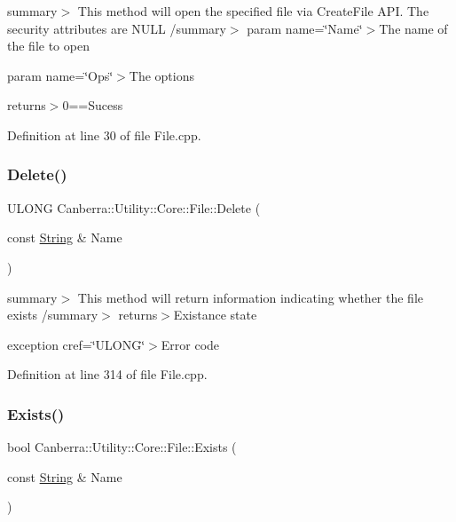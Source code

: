 summary$>$ This method will open the specified file via Create\+File A\+PI. The security attributes are N\+U\+LL /summary$>$ param name=\char`\"{}\+Name\char`\"{}$>$The name of the file to open

param name=\char`\"{}\+Ops\char`\"{}$>$The options

returns$>$0==Sucess

Definition at line 30 of file File.\+cpp.

\mbox{\label{class_canberra_1_1_utility_1_1_core_1_1_file_a21294a585475929cf9c68a165816b7a7_a21294a585475929cf9c68a165816b7a7}} 
\subsubsection{\texorpdfstring{Delete()}{Delete()}}
{\footnotesize\ttfamily U\+L\+O\+NG Canberra\+::\+Utility\+::\+Core\+::\+File\+::\+Delete (\begin{DoxyParamCaption}\item[{const \hyperlink{class_canberra_1_1_utility_1_1_core_1_1_string}{String} \&}]{Name }\end{DoxyParamCaption})\hspace{0.3cm}{\ttfamily [static]}}

summary$>$ This method will return information indicating whether the file exists /summary$>$ returns$>$Existance state

exception cref=\char`\"{}\+U\+L\+O\+N\+G\char`\"{}$>$Error code

Definition at line 314 of file File.\+cpp.

\mbox{\label{class_canberra_1_1_utility_1_1_core_1_1_file_a255660e688ccaf7b56b9da31a3f09eea_a255660e688ccaf7b56b9da31a3f09eea}} 
\subsubsection{\texorpdfstring{Exists()}{Exists()}}
{\footnotesize\ttfamily bool Canberra\+::\+Utility\+::\+Core\+::\+File\+::\+Exists (\begin{DoxyParamCaption}\item[{const \hyperlink{class_canberra_1_1_utility_1_1_core_1_1_string}{String} \&}]{Name }\end{DoxyParamCaption})\hspace{0.3cm}{\ttfamily [static]}}

